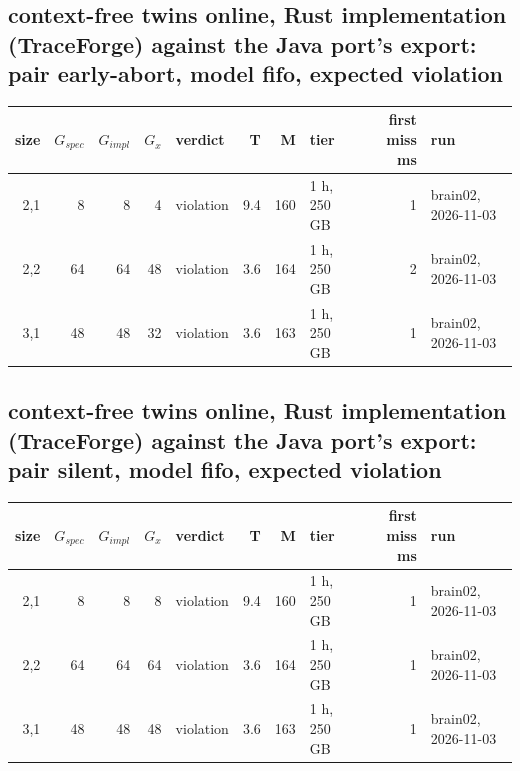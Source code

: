 \documentclass[10pt]{article}
\begin{document}
\subsection*{context-free twins online, Rust implementation (TraceForge) against the Java port's export: pair \textsf{early-abort}, model fifo, expected violation}
\begin{longtable}{@{}rrrrlrrlrl@{}}
\toprule
size & $G_{\mathit{spec}}$ & $G_{\mathit{impl}}$ & $G_x$ & verdict & T & M & tier & first miss ms & run \\
\midrule
\endhead
\color{red} 2,1 & 8 & 8 & 4 & violation & 9.4 & 160 & 1 h, 250 GB & 1 & brain02, 2026-11-03 \\
\color{red} 2,2 & 64 & 64 & 48 & violation & 3.6 & 164 & 1 h, 250 GB & 2 & brain02, 2026-11-03 \\
\color{red} 3,1 & 48 & 48 & 32 & violation & 3.6 & 163 & 1 h, 250 GB & 1 & brain02, 2026-11-03 \\
\bottomrule
\end{longtable}
\subsection*{context-free twins online, Rust implementation (TraceForge) against the Java port's export: pair \textsf{silent}, model fifo, expected violation}
\begin{longtable}{@{}rrrrlrrlrl@{}}
\toprule
size & $G_{\mathit{spec}}$ & $G_{\mathit{impl}}$ & $G_x$ & verdict & T & M & tier & first miss ms & run \\
\midrule
\endhead
\color{red} 2,1 & 8 & 8 & 8 & violation & 9.4 & 160 & 1 h, 250 GB & 1 & brain02, 2026-11-03 \\
\color{red} 2,2 & 64 & 64 & 64 & violation & 3.6 & 164 & 1 h, 250 GB & 1 & brain02, 2026-11-03 \\
\color{red} 3,1 & 48 & 48 & 48 & violation & 3.6 & 163 & 1 h, 250 GB & 1 & brain02, 2026-11-03 \\
\bottomrule
\end{longtable}
\end{document}
